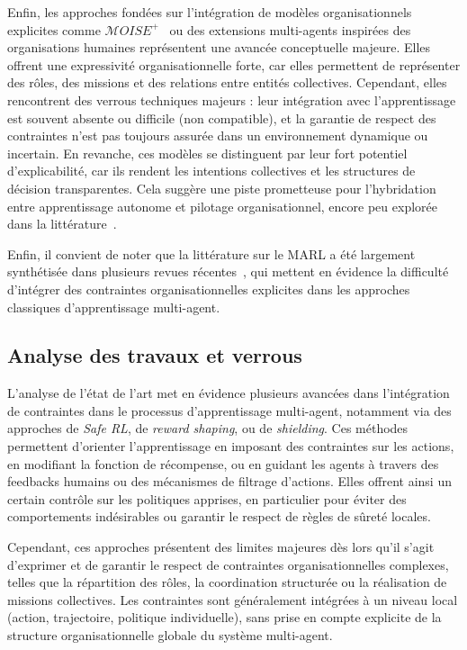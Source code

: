 Enfin, les approches fondées sur l’intégration de modèles organisationnels explicites comme $\mathcal{M}OISE^+$~\cite{hubner2007using} ou des extensions multi-agents inspirées des organisations humaines représentent une avancée conceptuelle majeure. Elles offrent une expressivité organisationnelle forte, car elles permettent de représenter des rôles, des missions et des relations entre entités collectives. Cependant, elles rencontrent des verrous techniques majeurs : leur intégration avec l’apprentissage est souvent absente ou difficile (non compatible), et la garantie de respect des contraintes n’est pas toujours assurée dans un environnement dynamique ou incertain. En revanche, ces modèles se distinguent par leur fort potentiel d’explicabilité, car ils rendent les intentions collectives et les structures de décision transparentes. Cela suggère une piste prometteuse pour l’hybridation entre apprentissage autonome et pilotage organisationnel, encore peu explorée dans la littérature~\cite{bordini2006jade, chernova2014robot}.

\medskip

\noindent
Enfin, il convient de noter que la littérature sur le MARL a été largement synthétisée dans plusieurs revues récentes~\cite{Zhang2021, Papoudakis2021}, qui mettent en évidence la difficulté d’intégrer des contraintes organisationnelles explicites dans les approches classiques d’apprentissage multi-agent.

\subsection*{Analyse des travaux et verrous}

L’analyse de l’état de l’art met en évidence plusieurs avancées dans l’intégration de contraintes dans le processus d’apprentissage multi-agent, notamment via des approches de \textit{Safe RL}, de \textit{reward shaping}, ou de \textit{shielding}. Ces méthodes permettent d’orienter l’apprentissage en imposant des contraintes sur les actions, en modifiant la fonction de récompense, ou en guidant les agents à travers des feedbacks humains ou des mécanismes de filtrage d’actions. Elles offrent ainsi un certain contrôle sur les politiques apprises, en particulier pour éviter des comportements indésirables ou garantir le respect de règles de sûreté locales.

Cependant, ces approches présentent des limites majeures dès lors qu’il s’agit d’exprimer et de garantir le respect de contraintes organisationnelles complexes, telles que la répartition des rôles, la coordination structurée ou la réalisation de missions collectives. Les contraintes sont généralement intégrées à un niveau local (action, trajectoire, politique individuelle), sans prise en compte explicite de la structure organisationnelle globale du système multi-agent.


